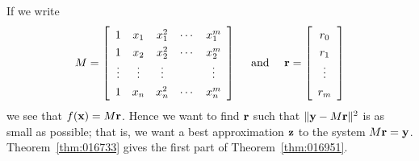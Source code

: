 \noindent If we write
\begin{equation*}
M = \def\arraystretch{1.3}
\leftB \begin{array}{ccccc}
1 & x_1 & x_1^2 & \cdots & x_1^m \\
1 & x_2 & x_2^2 & \cdots & x_2^m \\
\vdots & \vdots & \vdots & & \vdots \\
1 & x_n & x_n^2 & \cdots & x_n^m \\
\end{array} \rightB
\quad \mbox{ and } \quad \vect{r} = 
\leftB \begin{array}{c}
r_0 \\
r_1 \\
\vdots \\
r_m
\end{array} \rightB
\end{equation*}
we see that $f(\textbf{x}) = M\textbf{r}$. Hence we want to find $\textbf{r}$ such that $\|\textbf{y} - M\textbf{r}\|^{2}$ is as small as possible; that is, we want a best approximation $\textbf{z}$ to the system $M\textbf{r} = \textbf{y}$. Theorem~\ref{thm:016733} gives the first part of Theorem~\ref{thm:016951}.

